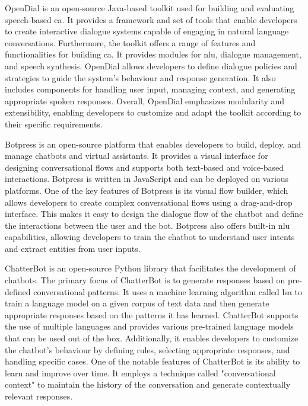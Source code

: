 \documentclass[a4paper,fleqn]{cas-sc}
\begin{document}
OpenDial \cite{opendial} is an open-source Java-based toolkit used for building and evaluating speech-based \gls{ca}. It provides a framework and set of tools that enable developers to create interactive dialogue systems capable of engaging in natural language conversations. Furthermore, the toolkit offers a range of features and functionalities for building \gls{ca}. It provides modules for \gls{nlu}, dialogue management, and speech synthesis. OpenDial allows developers to define dialogue policies and strategies to guide the system's behaviour and response generation. It also includes components for handling user input, managing context, and generating appropriate spoken responses. Overall, OpenDial emphasizes modularity and extensibility, enabling developers to customize and adapt the toolkit according to their specific requirements. 

Botpress \cite{botpress} is an open-source platform that enables developers to build, deploy, and manage chatbots and virtual assistants. It provides a visual interface for designing conversational flows and supports both text-based and voice-based interactions. Botpress is written in JavaScript and can be deployed on various platforms. One of the key features of Botpress is its visual flow builder, which allows developers to create complex conversational flows using a drag-and-drop interface. This makes it easy to design the dialogue flow of the chatbot and define the interactions between the user and the bot. Botpress also offers built-in \gls{nlu} capabilities, allowing developers to train the chatbot to understand user intents and extract entities from user inputs.

ChatterBot \cite{chatterbot} is an open-source Python library that facilitates the development of chatbots. The primary focus of ChatterBot is to generate responses based on pre-defined conversational patterns. It uses a machine learning algorithm called \gls{lsa} to train a language model on a given corpus of text data and  then generate appropriate responses based on the patterns it has learned. ChatterBot supports the use of multiple languages and provides various pre-trained language models that can be used out of the box. Additionally, it enables developers to customize the chatbot's behaviour by defining rules, selecting appropriate responses, and handling specific cases. One of the notable features of ChatterBot is its ability to learn and improve over time. It employs a technique called "conversational context" to maintain the history of the conversation and generate contextually relevant responses. 
\end{document}
